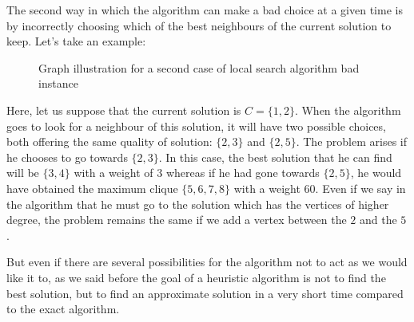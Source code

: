 The second way in which the algorithm can make a bad choice at a given time is by incorrectly 
choosing which of the best neighbours of the current solution to keep. Let's take an example:

\begin{figure}[H]
    \centering
    \caption{Graph illustration for a second case of local search algorithm bad instance}
    \label{fig:local-search-bad-instance-2}
\end{figure}

Here, let us suppose that the current solution is $C = \{1, 2\}$. When the algorithm goes 
to look for a neighbour of this solution, it will have two possible choices, both offering 
the same quality of solution: $\{2, 3\}$ and $\{2, 5\}$. The problem arises if he chooses 
to go towards $\{2, 3\}$. In this case, the best solution that he can find will be $\{3, 4\}$ 
with a weight of $3$ whereas if he had gone towards $\{2, 5\}$, he would have obtained the 
maximum clique $\{5, 6, 7, 8\}$ with a weight $60$. Even if we say in the algorithm that he 
must go to the solution which has the vertices of higher degree, the problem remains the 
same if we add a vertex between the $2$ and the $5$.
\bigskip

But even if there are several possibilities for the algorithm not to act as we would like it 
to, as we said before the goal of a heuristic algorithm is not to find the best solution, but 
to find an approximate solution in a very short time compared to the exact algorithm.